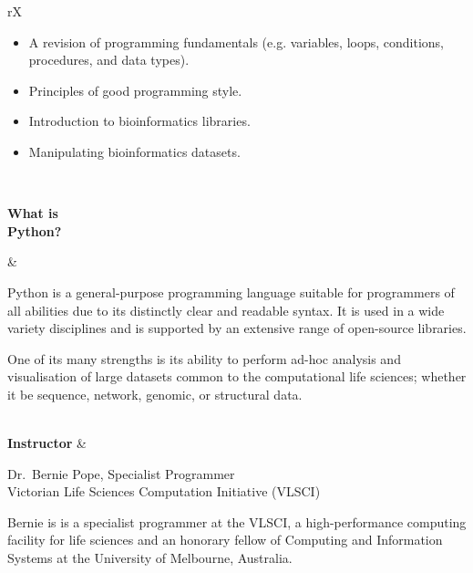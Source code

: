 \documentclass[11pt]{article}
\begin{document}
\begin{minipage}[t]{\linewidth}
\begin{tabu}{rX}
\begin{varwidth}[t]{\linewidth}
\begin{itemize}
                    \item A revision of programming fundamentals (e.g.
                        variables, loops, conditions, procedures, and data
                        types).
                    \item
                        Principles of good programming style.
                    \item
                        Introduction to bioinformatics libraries.
                    \item
                        Manipulating bioinformatics datasets.
                \end{itemize}
                \end{varwidth} \\
       \begin{varwidth}[t]{\linewidth}
           \textbf{What is\\ Python?}
       \end{varwidth} &
                \begin{varwidth}[t]{\linewidth}
                    \raggedright
                Python is a general-purpose programming language suitable for
                programmers of all abilities due to its distinctly clear and
                readable syntax. It is used in a wide variety disciplines and is
                supported by an extensive range of open-source libraries.\par
                \medskip
                One of its many strengths is its ability to perform ad-hoc
                analysis and visualisation of large datasets common to the
                computational life sciences; whether it be sequence, network,
                genomic, or structural data.
                               \end{varwidth} \\
        \textbf{Instructor} & \begin{varwidth}[t]{\linewidth}
                        Dr.~Bernie Pope, Specialist Programmer\\
                        Victorian Life Sciences Computation Initiative (VLSCI) \par
                    \bigskip
                    \raggedright
                    Bernie is is a specialist programmer at the VLSCI, a
                    high-performance computing facility for life sciences
                    and an honorary fellow of Computing and Information
                    Systems at the University of Melbourne,
                    Australia.\par

\end{varwidth}
\end{tabu}
\end{minipage}
\end{document}
